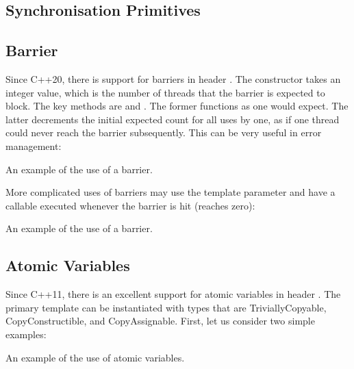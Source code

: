 \begin{itemize}
\begin{end}
\section{Synchronisation Primitives}

\subsection{Barrier}

Since C++20, there is support for barriers in header . The constructor takes an integer value, which is the number of threads that the barrier is expected to block. The key methods are  and . The former functions as one would expect. The latter decrements the initial expected count for all uses by one, as if one thread could never reach the barrier subsequently. This can be very useful in error management:

\raggedbottom
\begin{codebox}[]{\href{https://godbolt.org/z/KrzfYe88s}{\ExternalLink}}
\footnotesize An example of the use of a barrier.
\tcblower
{}
\end{codebox}

More complicated uses of barriers may use the template parameter  and have a callable executed whenever the barrier is hit (reaches zero):

\raggedbottom
\begin{codebox}[]{\href{https://godbolt.org/z/EjW8xc8fc}{\ExternalLink}}
\footnotesize An example of the use of a barrier.
\tcblower
{}
\end{codebox}

\subsection{Atomic Variables}
\label{sec:atomiccpp23}

Since C++11, there is an excellent support for atomic variables in header . 
The primary template can be instantiated with types that are TriviallyCopyable, CopyConstructible, and CopyAssignable.
First, let us consider two simple examples:

\raggedbottom
\begin{codebox}[]{\href{https://godbolt.org/z/Ezqo4G7Ec}{\ExternalLink}}
\footnotesize An example of the use of atomic variables.
\tcblower
{}
\end{codebox}


\end{end}
\end{itemize}

